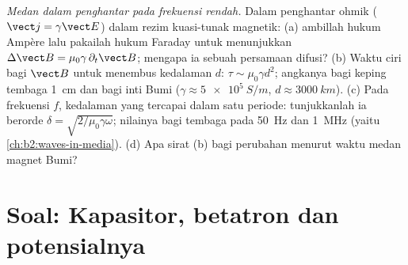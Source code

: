 \begin{exercise}[$\star\star\star$]\label{exo:b2:maxwell-equations:12}
\emph{Medan dalam penghantar pada frekuensi rendah.} Dalam penghantar ohmik
($\vect j = \gamma\vect E$) dalam rezim kuasi-tunak magnetik: (a) ambillah
 hukum Ampère lalu pakailah hukum Faraday untuk menunjukkan $\Delta\vect B = \mu_0\gamma\,
\partial_t\vect B$; mengapa ia sebuah persamaan difusi? (b) Waktu ciri
bagi $\vect B$ untuk menembus kedalaman $d$: $\tau \sim \mu_0\gamma d^2$; angkanya bagi
keping tembaga \qty{1}{cm} dan bagi inti Bumi ($\gamma \approx \qty{5e5}{S/m}$,
$d \approx \qty{3000}{km}$). (c) Pada frekuensi $f$, kedalaman yang tercapai dalam satu
periode: tunjukkanlah ia berorde $\delta = \sqrt{2/\mu_0\gamma\omega}$; nilainya bagi tembaga
pada \qty{50}{Hz} dan \qty{1}{MHz} (yaitu 
\cref{ch:b2:waves-in-media}). (d) Apa sirat (b) bagi perubahan
menurut waktu medan magnet Bumi?
\end{exercise}

\section{Soal: Kapasitor, betatron dan potensialnya}

